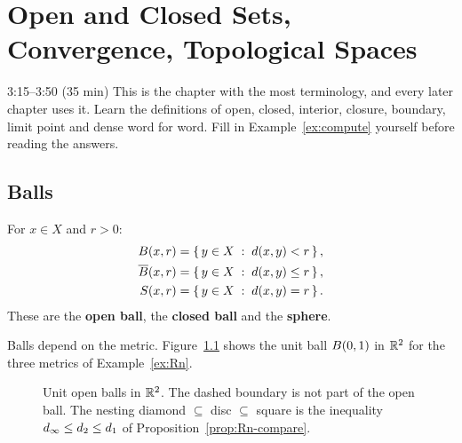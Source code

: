 \chapter{Open and Closed Sets, Convergence, Topological Spaces}\label{ch:2}
\begin{studyslot}{3:15--3:50 (35 min)}
This is the chapter with the most terminology, and every later chapter uses it. Learn the definitions of open, closed, interior, closure, boundary, limit point and dense word for word. Fill in Example~\ref{ex:compute} yourself before reading the answers.
\end{studyslot}

\section{Balls}
\begin{definition}
For $x\in X$ and $r>0$:
\begin{align*}
  B(x,r)&=\left\{\, y\in X \;:\; d(x,y)<r \,\right\}, \\
  \overline{B}(x,r)&=\left\{\, y\in X \;:\; d(x,y)\le r \,\right\}, \\
  S(x,r)&=\left\{\, y\in X \;:\; d(x,y)=r \,\right\}.
\end{align*}
These are the \textbf{open ball}, the \textbf{closed ball} and the \textbf{sphere}.
\end{definition}

Balls depend on the metric. Figure~\ref{fig:balls} shows the unit ball $B(0,1)$ in $\mathbb{R}^2$ for the three metrics of Example~\ref{ex:Rn}.

\begin{figure}[ht]
\centering
{}
\caption{Unit open balls in $\mathbb{R}^2$. The dashed boundary is not part of the open ball. The nesting diamond $\subseteq$ disc $\subseteq$ square is the inequality $d_\infty\le d_2\le d_1$ of Proposition~\ref{prop:Rn-compare}.}
\label{fig:balls}
\end{figure}

